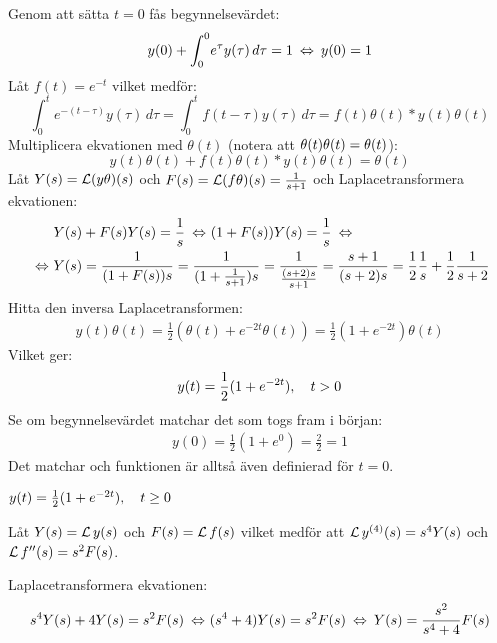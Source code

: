 \pagebreak
\begin{task}{6.11}
	Genom att sätta $t=0$ fås begynnelsevärdet:
	\[y(0)+\int_{0}^{0}\!e^{\tau}y(\tau)\,d\tau=1 \lra
	y(0)=1\]
	Låt $f(t)=e^{-t}$ vilket medför:
	\[\int_{0}^{t}\!e^{-(t-\tau)}y(\tau)\,d\tau=
	\int_{0}^{t}\!f(t-\tau)y(\tau)\,d\tau=
	f(t)\theta(t)*y(t)\theta(t)\]
	Multiplicera ekvationen med $\theta(t)$ (notera att $\theta(t)\*\theta(t)=\theta(t)$):
	\[y(t)\theta(t)+f(t)\theta(t)*y(t)\theta(t)=\theta(t)\]
	Låt $Y(s)=\operatorname{\mathcal{L}}(y\theta)(s)$ och $F(s)=\operatorname{\mathcal{L}}(f\theta)(s)=\frac{1}{s+1}$ och Laplacetransformera ekvationen:
	\begin{align*}
	&Y(s)+F(s)\*Y(s)=\frac{1}{s} \lra
	(1+F(s))Y(s)=\frac{1}{s} \lra \\ \lra
	&Y(s)=
	\frac{1}{(1+F(s))s}=
	\frac{1}{(1+\frac{1}{s+1})s}=
	\frac{1}{\frac{(s+2)s}{s+1}}=
	\frac{s+1}{(s+2)s}=
	\frac{1}{2}\*\frac{1}{s}+\frac{1}{2}\*\frac{1}{s+2}
	\end{align*}
	Hitta den inversa Laplacetransformen:
	\begin{align*}
	y(t)\theta(t)=\frac{1}{2}(\theta(t)+e^{-2t}\theta(t))=\frac{1}{2}(1+e^{-2t})\theta(t)
	\end{align*}
	Vilket ger:
	\begin{align*}
	y(t)=\frac{1}{2}(1+e^{-2t}), \quad t>0
	\end{align*}
	Se om begynnelsevärdet matchar det som togs fram i början:
	\begin{align*}
	y(0)=\frac{1}{2}(1+e^{0})=\frac{2}{2}=1
	\end{align*}
	Det matchar och funktionen är alltså även definierad för $t=0$.
	
	\ans $y(t)=\frac{1}{2}(1+e^{-2t}), \quad t\ge0$
\end{task}

\begin{task}{6.12}
	Låt $Y(s)=\operatorname{\mathcal{L}} y(s)$ och $F(s)=\operatorname{\mathcal{L}} f(s)$ vilket medför att $\operatorname{\mathcal{L}} y^{(4)}(s)=s^4Y(s)$ och $\operatorname{\mathcal{L}} f''(s)=s^2F(s)$.
	
	Laplacetransformera ekvationen:
	\[s^4Y(s)+4Y(s)=s^2F(s) \lra
	(s^4+4)Y(s)=s^2F(s) \lra
	Y(s)=\frac{s^2}{s^4+4}F(s)\]
\end{task}